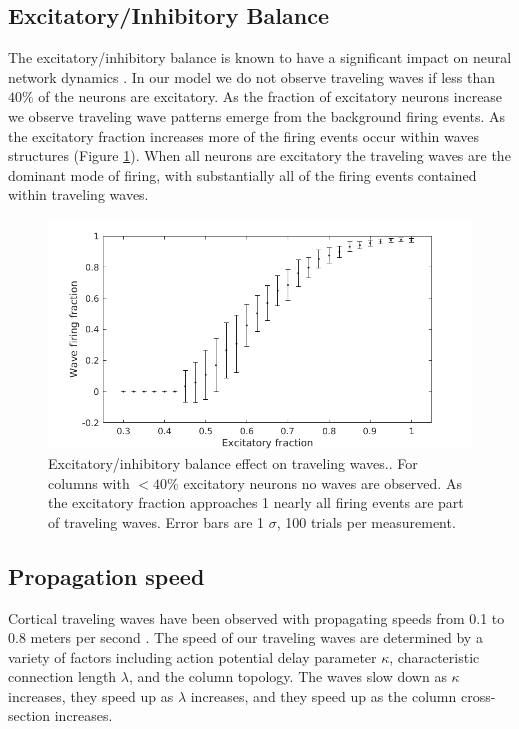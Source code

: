 \documentclass[a4paper,11pt]{article}
\begin{document}
\subsection{Excitatory/Inhibitory Balance} \label{sub:ei_balance}
The excitatory/inhibitory balance is known to have a significant impact on neural network dynamics \cite{keane2015}. 
In our model we do not observe traveling waves if less than $40\%$ of the neurons are excitatory.
As the fraction of excitatory neurons increase we observe traveling wave patterns emerge from the background firing events.
As the excitatory fraction increases more of the firing events occur within waves structures (Figure \ref{fig:excitatory_effect}).
When all neurons are excitatory the traveling waves are the dominant mode of firing, with substantially all of the firing events contained within traveling waves. \\
\begin{figure}[!htb]
 \caption{Excitatory/inhibitory balance effect on traveling waves.. 
	  For columns with $<40\%$ excitatory neurons no waves are observed.
	  As the excitatory fraction approaches 1 nearly all firing events are part of traveling waves.
	  Error bars are 1 $\sigma$, 100 trials per measurement.
	  }
 \label{fig:excitatory_effect}
 \centering
   \includegraphics[width=\textwidth]{fig/ExcitatoryWaves}
\end{figure}

\FloatBarrier

\subsection{Propagation speed} \label{sub:propagation_speed}
Cortical traveling waves have been observed with propagating speeds from 0.1 to 0.8 meters per second \cite{muller2018}.
The speed of our traveling waves are determined by a variety of factors including action potential delay parameter $\kappa$, characteristic connection length $\lambda$, and the column topology.
The waves slow down as $\kappa$ increases, they speed up as $\lambda$ increases, and they speed up as the column cross-section increases.
\end{document}
